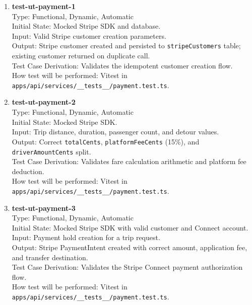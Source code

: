 \documentclass[12pt, titlepage]{article}
\begin{document}
\begin{enumerate}
\item \textbf{test-ut-payment-1}\\
Type: Functional, Dynamic, Automatic\\
Initial State: Mocked Stripe SDK and database.\\
Input: Valid Stripe customer creation parameters.\\
Output: Stripe customer created and persisted to \texttt{stripeCustomers} table; existing customer returned on duplicate call.\\
Test Case Derivation: Validates the idempotent customer creation flow.\\
How test will be performed: Vitest in \texttt{apps/api/services/\_\_tests\_\_/payment.test.ts}.\\

\item \textbf{test-ut-payment-2}\\
Type: Functional, Dynamic, Automatic\\
Initial State: Mocked Stripe SDK.\\
Input: Trip distance, duration, passenger count, and detour values.\\
Output: Correct \texttt{totalCents}, \texttt{platformFeeCents} (15\%), and \texttt{driverAmountCents} split.\\
Test Case Derivation: Validates fare calculation arithmetic and platform fee deduction.\\
How test will be performed: Vitest in \texttt{apps/api/services/\_\_tests\_\_/payment.test.ts}.\\

\item \textbf{test-ut-payment-3}\\
Type: Functional, Dynamic, Automatic\\
Initial State: Mocked Stripe SDK with valid customer and Connect account.\\
Input: Payment hold creation for a trip request.\\
Output: Stripe PaymentIntent created with correct amount, application fee, and transfer destination.\\
Test Case Derivation: Validates the Stripe Connect payment authorization flow.\\
How test will be performed: Vitest in \texttt{apps/api/services/\_\_tests\_\_/payment.test.ts}.\\


\end{enumerate}
\end{document}
